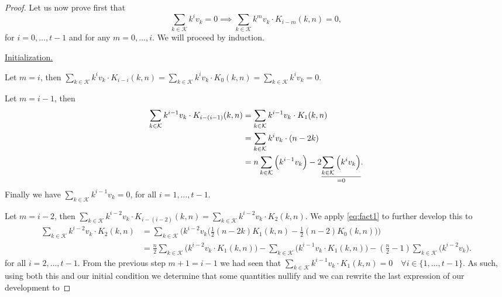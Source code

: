 \begin{proof}
        Let us now prove first that
    $$\sum_{k \in \mathcal{K}} k^iv_k = 0 \implies \sum_{k \in \mathcal{K}} k^mv_k \cdot K_{i-m}(k, n) = 0,$$ for $i = 0, \ldots, t-1$ and for any $m = 0, \ldots, i$. We will proceed by induction.

    \underline{Initialization.}

    Let $m = i$, then $\sum_{k \in \mathcal{K}} k^iv_k \cdot K_{i - i}(k, n) = \sum_{k \in \mathcal{K}} k^iv_k \cdot K_{0}(k, n) = \sum_{k \in \mathcal{K}} k^iv_k = 0$.

    Let $m = i - 1$, then
    \begin{equation*}
        \begin{split}
            \sum_{k \in \mathcal{K}} k^{i-1}v_k \cdot K_{i - (i-1)}(k, n) &= \sum_{k \in \mathcal{K}} k^{i-1}v_k \cdot K_{1}(k, n)\\ &= \sum_{k \in \mathcal{K}} k^iv_k \cdot (n - 2k)\\ &= n\sum_{k \in \mathcal{K}} \Big( k^{i-1}v_k \Big) - 2\underset{=0}{\underline{\sum_{k \in \mathcal{K}} \Big( k^iv_k \Big)}}.
        \end{split}
    \end{equation*}
    Finally we have $\sum_{k \in \mathcal{K}} k^{i-1}v_k = 0$, for all $i = 1, \ldots, t-1$.

    Let $m = i - 2$, then $\sum_{k \in \mathcal{K}} k^{i-2}v_k \cdot K_{i - (i-2)}(k, n) = \sum_{k \in \mathcal{K}} k^{i-2}v_k \cdot K_{2}(k, n)$. We apply \cref{eq:fact1} to further develop this to
    \begin{equation*}
        \begin{split}
            \sum_{k \in \mathcal{K}} k^{i-2}v_k \cdot K_{2}(k, n) &= \sum_{k \in \mathcal{K}} \Big( k^{i-2}v_k \Big( \frac{1}{2}(n - 2k)K_1(k, n) - \frac{1}{2}(n - 2)K_0(k, n) \Big)\Big)\\
            &= \frac{n}{2}\sum_{k \in \mathcal{K}} \Big( k^{i-2}v_k \cdot K_1(k, n) \Big) - \sum_{k \in \mathcal{K}} \Big( k^{i-1}v_k \cdot K_1(k,n) \Big) - (\frac{n}{2}-1)\sum_{k \in \mathcal{K}} \Big( k^{i-2}v_k \Big).
        \end{split}
    \end{equation*}
    for all $i = 2, \ldots, t-1$.
    From the previous step $m +1 = i - 1$ we had seen that $\sum_{k \in \mathcal{K}} k^{i-1}v_k \cdot K_1(k, n) = 0\quad \forall i\in \{1, \ldots, t-1\}$. As such, using both this and our initial condition we determine that some quantities nullify and we can rewrite the last expression of our development to


\end{proof}
